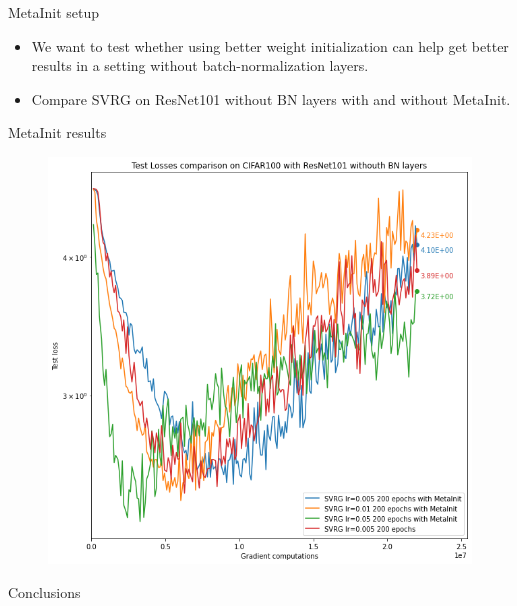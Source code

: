 \documentclass[10pt]{beamer}
\begin{document}
\begin{frame}{MetaInit setup}
    \begin{itemize}
        \item We want to test whether using better weight initialization can help get better results in a setting without batch-normalization layers.
        \item Compare SVRG on ResNet101 without BN layers with and without MetaInit.
    \end{itemize}
    
    
\end{frame}

\begin{frame}{MetaInit results}
     \begin{figure}
         \centering
         \includegraphics[scale=0.35]{report/figures/MetaInit_results_final.png}
         \label{fig:MetaInitresults}
     \end{figure}
\end{frame}

\begin{frame}{ }
    \begin{center}
        \Huge Conclusions
    \end{center}
\end{frame}
\end{document}
